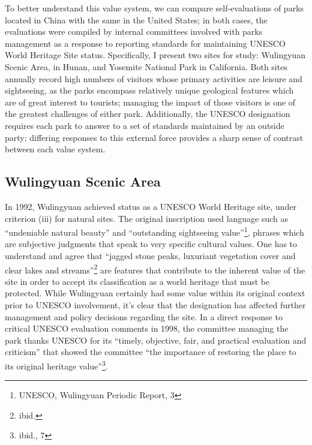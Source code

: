 To better understand this value system, we can compare self-evaluations of parks
located in China with the same in the United States; in both cases, the
evaluations were compiled by internal committees involved with parks management
as a response to reporting standards for maintaining UNESCO World Heritage Site
status. Specifically, I present two sites for study: Wulingyuan Scenic Area, in
Hunan, and Yosemite National Park in California. Both sites annually record high
numbers of visitors whose primary activities are leisure and sightseeing, as the
parks encompass relatively unique geological features which are of great
interest to tourists; managing the impact of those visitors is one of the
greatest challenges of either park. Additionally, the UNESCO designation
requires each park to answer to a set of standards maintained by an outside
party; differing responses to this external force provides a sharp sense of
contrast between each value system.

\subsection*{Wulingyuan Scenic Area}

In 1992, Wulingyuan achieved status as a UNESCO World Heritage site, under
criterion (iii) for natural sites. The original inscription used
language such
as ``undeniable natural beauty'' and ``outstanding sightseeing
value''\footnote{UNESCO, Wulingyuan Periodic Report, 3}, phrases which are
subjective judgments that speak to very specific cultural values. One has to
understand and agree that ``jagged stone peaks, luxuriant vegetation cover and
clear lakes and streams''\footnote{ibid.} are features that contribute to the
inherent value of the site in order to accept its classification as a world
heritage that must be protected. While Wulingyuan certainly had some value
within its original context prior to UNESCO involvement, it's clear that the
designation has affected further management and policy decisions regarding the
site. In a direct response to critical UNESCO evaluation comments in 1998, the
committee managing the park thanks UNESCO for its ``timely, objective, fair, and
practical evaluation and criticism'' that showed the committee ``the importance
of restoring the place to its original heritage value''\footnote{ibid., 7}.

